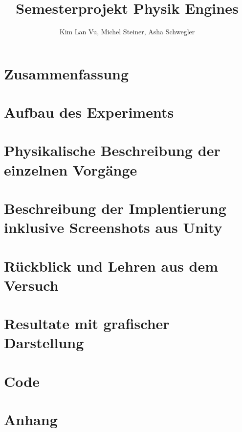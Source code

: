 \documentclass[11pt,paper=A4, margin=1cm]{article}
\title{Semesterprojekt Physik Engines}
\author{Kim Lan Vu, Michel Steiner, Asha Schwegler}
\begin{document}
\maketitle
\newpage

\tableofcontents



\newpage

\section {Zusammenfassung}


\section {Aufbau des Experiments}


\section {Physikalische Beschreibung der einzelnen Vorgänge}


\section {Beschreibung der Implentierung inklusive Screenshots aus Unity}


\section {Rückblick und Lehren aus dem Versuch}


\section {Resultate mit grafischer Darstellung}

\newpage
\section {Code}


\appendix
\section {Anhang}

\listoffigures

\newpage

\printbibliography
\end{document}
